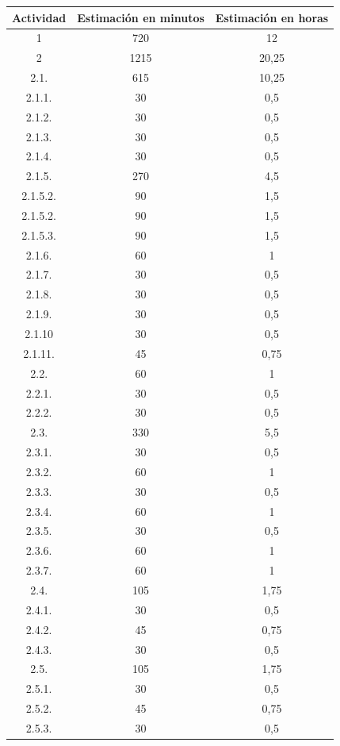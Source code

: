 \begin{longtable}{c|c|c}
\textbf{Actividad} & \textbf{Estimación en minutos} & \textbf{Estimación en horas} \\ \hline
1 & 720 & 12 \\ \hline
2 & 1215 & 20,25 \\ \hline
2.1. & 615 & 10,25 \\ \hline
2.1.1. & 30 & 0,5 \\ \hline
2.1.2. & 30 & 0,5 \\ \hline
2.1.3. & 30 & 0,5 \\ \hline
2.1.4. & 30 & 0,5 \\ \hline
2.1.5. & 270 & 4,5 \\ \hline
2.1.5.2. & 90 & 1,5 \\ \hline
2.1.5.2. & 90 & 1,5 \\ \hline
2.1.5.3. & 90 & 1,5 \\ \hline
2.1.6. & 60 & 1 \\ \hline
2.1.7. & 30 & 0,5 \\ \hline
2.1.8. & 30 & 0,5 \\ \hline
2.1.9. & 30 & 0,5 \\ \hline
2.1.10 & 30 & 0,5 \\ \hline
2.1.11. & 45 & 0,75 \\ \hline
2.2. & 60 & 1 \\ \hline
2.2.1. & 30 & 0,5 \\ \hline
2.2.2. & 30 & 0,5 \\ \hline
2.3. & 330 & 5,5 \\ \hline
2.3.1. & 30 & 0,5 \\ \hline
2.3.2. & 60 & 1 \\ \hline
2.3.3. & 30 & 0,5 \\ \hline
2.3.4. & 60 & 1 \\ \hline
2.3.5. & 30 & 0,5 \\ \hline
2.3.6. & 60 & 1 \\ \hline
2.3.7. & 60 & 1 \\ \hline
2.4. & 105 & 1,75 \\ \hline
2.4.1. & 30 & 0,5 \\ \hline
2.4.2. & 45 & 0,75 \\ \hline
2.4.3. & 30 & 0,5 \\ \hline
2.5. & 105 & 1,75 \\ \hline
2.5.1. & 30 & 0,5 \\ \hline
2.5.2. & 45 & 0,75 \\ \hline
2.5.3. & 30 & 0,5 \\ \hline

\end{longtable}
